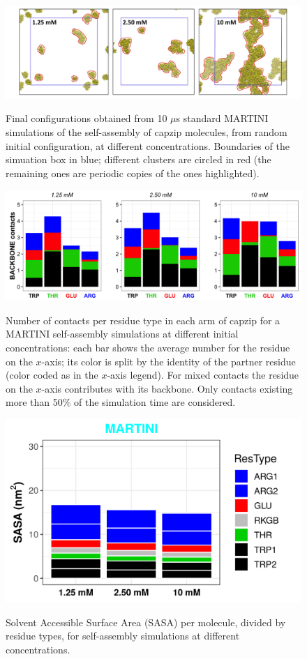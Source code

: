 \begin{figure}
\centering
\includegraphics[width=0.95\linewidth]{3results_capsule/pics/final_SA.png} 
\caption[(SI) Self-assembly simulations, final configurations]{Final configurations obtained from 10 $\mu$s standard MARTINI simulations of the self-assembly of capzip molecules, from random initial configuration, at different concentrations. Boundaries of the simuation box in blue; different clusters are circled in red (the remaining ones are periodic copies of the ones highlighted).}
\label{fig:SA_final}
\vspace{0.7cm}
\includegraphics[width=0.95\linewidth]{3results_capsule/pics/contacts_SA.png} 
\caption[(SI) Self-assembly simulations: contacts]{Number of contacts per residue type in each arm of capzip for a MARTINI self-assembly simulations at different initial concentrations: each bar shows the average number for the residue on the $x$-axis; its color is split by the identity of the partner residue (color coded as in the $x$-axis legend). For mixed contacts the residue on the $x$-axis contributes with its backbone. Only contacts existing more than 50\% of the simulation time are considered.}
\label{fig:SA_contacts}
\vspace{0.7cm}
\includegraphics[height=0.3\linewidth]{3results_capsule/pics/st_SA_sasa_fractions.png} \label{fig:SA_sasa}
\caption[(SI) Self-assembly simulations: SASA]{Solvent Accessible Surface Area (SASA) per molecule, divided by residue types, for self-assembly simulations at different concentrations.}
\label{fig:SA_sasa_all}
\end{figure}

